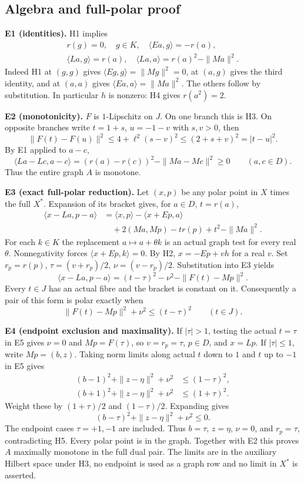 \documentclass[11pt,a4paper]{article}
\begin{document}
\subsection{Algebra and full-polar proof}

\textbf{E1 (identities).} H1 implies
\[
\begin{gathered}
r(g)=0,\quad g\in K,\quad
\langle Ea,g\rangle=-r(a),\\
\langle La,g\rangle=r(a),\quad
\langle La,a\rangle=r(a)^2-\|Ma\|^2.
\end{gathered}
\tag{E1}
\]
Indeed H1 at $(g,g)$ gives $\langle Eg,g\rangle=\|Mg\|^2=0$, at $(a,g)$ gives the third identity, and at $(a,a)$ gives $\langle Ea,a\rangle=\|Ma\|^2$. The others follow by substitution. In particular $h$ is nonzero: H4 gives $r(a^2)=2$.

\textbf{E2 (monotonicity).} $F$ is $1$-Lipschitz on $J$. On one branch this is H3. On opposite branches write $t=1+s$, $u=-1-v$ with $s,v>0$, then
\[
\|F(t)-F(u)\|^2\le4+\ell^2(s-v)^2\le(2+s+v)^2=|t-u|^2.
\]
By E1 applied to $a-c$,
\[
\langle La-Lc,a-c\rangle=(r(a)-r(c))^2-\|Ma-Mc\|^2\ge0
\qquad(a,c\in D).
\]
Thus the entire graph $A$ is monotone.

\textbf{E3 (exact full-polar reduction).} Let $(x,p)$ be any polar point in $X$ times the full $X^*$. Expansion of its bracket gives, for $a\in D$, $t=r(a)$,
\[
\begin{aligned}
\langle x-La,p-a\rangle
&=\langle x,p\rangle-\langle x+Ep,a\rangle\\
&\quad+2(Ma,Mp)-t r(p)+t^2-\|Ma\|^2.
\end{aligned}
\tag{E3}
\]
For each $k\in K$ the replacement $a\mapsto a+\theta k$ is an actual graph test for every real $\theta$. Nonnegativity forces $\langle x+Ep,k\rangle=0$. By H2, $x=-Ep+vh$ for a real $v$. Set $r_p=r(p)$, $\tau=(v+r_p)/2$, $\nu=(v-r_p)/2$. Substitution into E3 yields
\[
\langle x-La,p-a\rangle
=(t-\tau)^2-\nu^2-\|F(t)-Mp\|^2.
\tag{E4}
\label{eq:abstract-bracket}
\]
Every $t\in J$ has an actual fibre and the bracket is constant on it. Consequently a pair of this form is polar exactly when
\[
\|F(t)-Mp\|^2+\nu^2\le(t-\tau)^2\qquad(t\in J).
\tag{E5}
\]

\textbf{E4 (endpoint exclusion and maximality).} If $|\tau|>1$, testing the actual $t=\tau$ in E5 gives $\nu=0$ and $Mp=F(\tau)$, so $v=r_p=\tau$, $p\in D$, and $x=Lp$. If $|\tau|\le1$, write $Mp=(b,z)$. Taking norm limits along actual $t$ down to $1$ and $t$ up to $-1$ in E5 gives
\[
\begin{aligned}
(b-1)^2+\|z-\eta\|^2+\nu^2&\le(1-\tau)^2,\\
(b+1)^2+\|z-\eta\|^2+\nu^2&\le(1+\tau)^2.
\end{aligned}
\]
Weight these by $(1+\tau)/2$ and $(1-\tau)/2$. Expanding gives
\[
(b-\tau)^2+\|z-\eta\|^2+\nu^2\le0.
\tag{E6}
\]
The endpoint cases $\tau=+1,-1$ are included. Thus $b=\tau$, $z=\eta$, $\nu=0$, and $r_p=\tau$, contradicting H5. Every polar point is in the graph. Together with E2 this proves $A$ maximally monotone in the full dual pair. The limits are in the auxiliary Hilbert space under H3, no endpoint is used as a graph row and no limit in $X^*$ is asserted.
\end{document}
